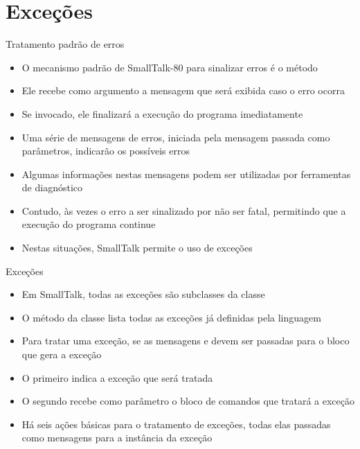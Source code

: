 \section{Exceções}

\begin{frame}[fragile]{Tratamento padrão de erros}

    \begin{itemize}
        \item O mecanismo padrão de SmallTalk-80 para sinalizar erros é o método

        \item Ele recebe como argumento a mensagem que será exibida caso o erro ocorra

        \item Se invocado, ele finalizará a execução do programa imediatamente

        \item Uma série de mensagens de erros, iniciada pela mensagem passada como parâmetros,
            indicarão os possíveis erros

        \item Algumas informações nestas mensagens podem ser utilizadas por ferramentas de
            diagnóstico

        \item Contudo, às vezes o erro a ser sinalizado por não ser fatal, permitindo que a 
            execução do programa continue

        \item Nestas situações, SmallTalk permite o uso de exceções
    \end{itemize}

\end{frame}

\begin{frame}[fragile]{Exceções}

    \begin{itemize}
        \item Em SmallTalk, todas as exceções são subclasses da classe 

        \item O método  da classe  lista
            todas as exceções já definidas pela linguagem

        \item Para tratar uma exceção, se as mensagens  e 
             devem ser passadas para o bloco que gera a exceção

        \item O primeiro indica a exceção que será tratada

        \item O segundo recebe como parâmetro o bloco de comandos que tratará a exceção

        \item Há seis ações básicas para o tratamento de exceções, todas elas passadas como
            mensagens para a instância da exceção
    \end{itemize}

\end{frame}

